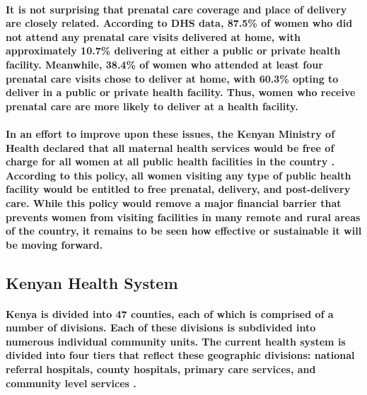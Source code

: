\paragraph{It is not surprising that prenatal care coverage and place of delivery are closely related. According to DHS data, 87.5\% of women who did not attend any prenatal care visits delivered at home, with approximately 10.7\% delivering at either a public or private health facility. Meanwhile, 38.4\% of women who attended at least four prenatal care visits chose to deliver at home, with 60.3\% opting to deliver in a public or private health facility. Thus, women who receive prenatal care are more likely to deliver at a health facility.}

\paragraph{In an effort to improve upon these issues, the Kenyan Ministry of Health declared that all maternal health services would be free of charge for all women at all public health facilities in the country \citep{MOH2013}. According to this policy, all women visiting any type of public health facility would be entitled to free prenatal, delivery, and post-delivery care. While this policy would remove a major financial barrier that prevents women from visiting facilities in many remote and rural areas of the country, it remains to be seen how effective or sustainable it will be moving forward.}

\subsection{Kenyan Health System}
\paragraph{Kenya is divided into 47 counties, each of which is comprised of a number of divisions. Each of these divisions is subdivided into numerous individual community units. The current health system is divided into four tiers that reflect these geographic divisions: national referral hospitals, county hospitals, primary care services, and community level services \citep{SPA2010}.}

